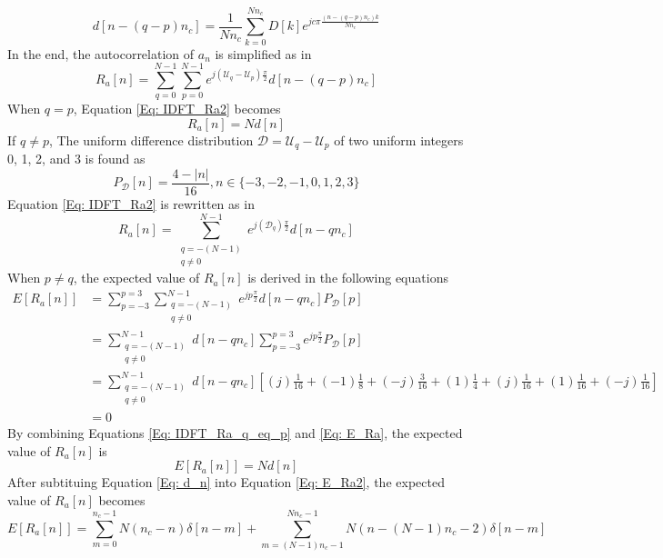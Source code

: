 \documentclass[draftcls,onecolumn]{IEEEtran}  %
\begin{document}
\begin{equation}\label{Eq: dn_tmp}
d[n-(q-p)n_c] = \frac{1}{Nn_c} \sum\limits_{k=0}^{Nn_c} D[k] e^{jc\pi \frac{(n-(q-p)n_c) k}{Nn_c}} 
\end{equation}
In the end, the autocorrelation of $a_n$ is simplified as in
\begin{equation}\label{Eq: IDFT_Ra2}
R_a[n] = \sum\limits_{q=0}^{N-1} \sum\limits_{p=0}^{N-1} 
e^{j(\mathcal{U}_q-\mathcal{U}_p)\frac{\pi}{2}} d[n-(q-p)n_c]
\end{equation}
When $q = p$, Equation \ref{Eq: IDFT_Ra2} becomes
\begin{equation}\label{Eq: IDFT_Ra_q_eq_p}
R_a[n] = N d[n]
\end{equation}
If $q \neq p$, The uniform difference distribution $\mathcal{D} = \mathcal{U}_q-\mathcal{U}_p$ of two uniform integers 0, 1, 2, and 3 is found as 
\begin{equation}\label{Eq: diff_uni}
P_{\mathcal{D}}[n] = \frac{4-|n|}{16}, n \in \{ -3,-2,-1,0,1,2,3 \} 
\end{equation}
Equation \ref{Eq: IDFT_Ra2} is rewritten as in
\begin{equation}\label{Eq: IDFT_Ra3}
R_a[n] = \sum\limits_{\substack{q=-(N-1) \\ q\neq 0}}^{N-1} e^{j(\mathcal{D}_q)\frac{\pi}{2}} d[n-q n_c]
\end{equation}
When $p \neq q $, the expected value of $R_a[n]$ is derived in the following equations
\begin{equation}\label{Eq: E_Ra}
\begin{split}
E[R_a[n]] &= \sum\limits_{p=-3}^{p=3} \sum\limits_{\substack{q=-(N-1) \\ q\neq 0}}^{N-1}  e^{j p\frac{\pi}{2}} d[n-q n_c] P_{\mathcal{D}}[p] \\
          &= \sum\limits_{\substack{q=-(N-1) \\ q\neq 0}}^{N-1} d[n-q n_c]  \sum\limits_{p=-3}^{p=3} e^{j p\frac{\pi}{2}}  P_{\mathcal{D}}[p] \\
          &= \sum\limits_{\substack{q=-(N-1) \\ q\neq 0}}^{N-1} d[n-q n_c] [(j) \frac{1}{16} + (-1) \frac{1}{8} + (-j) \frac{3}{16} + (1) \frac{1}{4} + (j) \frac{1}{16} + (1) \frac{1}{16} + (-j) \frac{1}{16}] \\
          &= 0
\end{split}
\end{equation}
By combining Equations \ref{Eq: IDFT_Ra_q_eq_p} and \ref{Eq: E_Ra}, the expected value of $R_a[n]$ is
\begin{equation}\label{Eq: E_Ra2}
E[R_a[n]] = N d[n]
\end{equation}
After subtituing Equation \ref{Eq: d_n} into Equation \ref{Eq: E_Ra2}, the expected value of $R_a[n]$ becomes
\begin{equation}\label{Eq: E_Ra3}
E[R_a[n]] = \sum\limits_{m=0}^{n_c-1} N(n_c-n)\delta[n-m] + 
            \sum\limits_{m=(N-1)n_c-1}^{Nn_c-1} N(n-(N-1)n_c-2)\delta[n-m] 
\end{equation}
\end{document}
